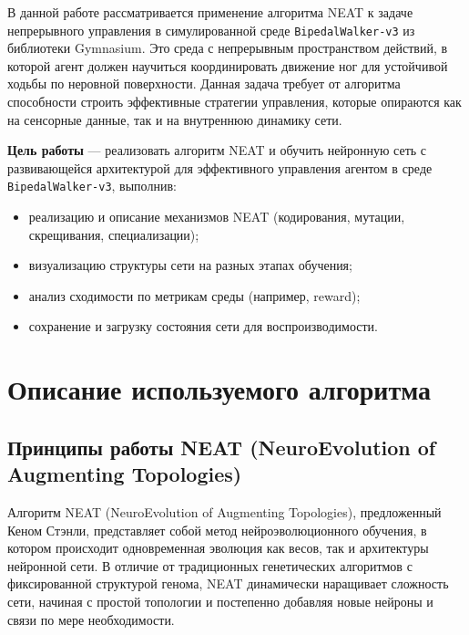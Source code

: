\documentclass[a4paper,12pt]{article}
\begin{document}
В данной работе рассматривается применение алгоритма NEAT к задаче непрерывного управления в симулированной среде \texttt{BipedalWalker-v3} из библиотеки Gymnasium. Это среда с непрерывным пространством действий, в которой агент должен научиться координировать движение ног для устойчивой ходьбы по неровной поверхности. Данная задача требует от алгоритма способности строить эффективные стратегии управления, которые опираются как на сенсорные данные, так и на внутреннюю динамику сети.

\textbf{Цель работы} — реализовать алгоритм NEAT и обучить нейронную сеть с развивающейся архитектурой для эффективного управления агентом в среде \texttt{BipedalWalker-v3}, выполнив:
\begin{itemize}
  \item реализацию и описание механизмов NEAT (кодирования, мутации, скрещивания, специализации);
  \item визуализацию структуры сети на разных этапах обучения;
  \item анализ сходимости по метрикам среды (например, reward);
  \item сохранение и загрузку состояния сети для воспроизводимости.
\end{itemize}


\newpage
\section{Описание используемого алгоритма}

\subsection{Принципы работы NEAT (NeuroEvolution of Augmenting Topologies)}
Алгоритм NEAT (NeuroEvolution of Augmenting Topologies), предложенный Кеном Стэнли, представляет собой метод нейроэволюционного обучения, в котором происходит одновременная эволюция как весов, так и архитектуры нейронной сети. В отличие от традиционных генетических алгоритмов с фиксированной структурой генома, NEAT динамически наращивает сложность сети, начиная с простой топологии и постепенно добавляя новые нейроны и связи по мере необходимости.
\end{document}
